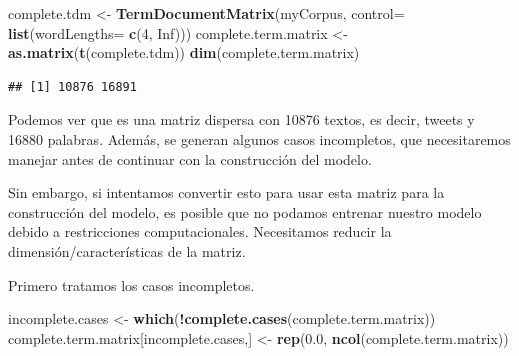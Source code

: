 \documentclass[
]{article}
\newenvironment{Shaded}{\begin{snugshade}}{\end{snugshade}}
\newcommand{\DataTypeTok}[1]{\textcolor[rgb]{0.13,0.29,0.53}{#1}}
\newcommand{\DecValTok}[1]{\textcolor[rgb]{0.00,0.00,0.81}{#1}}
\newcommand{\FloatTok}[1]{\textcolor[rgb]{0.00,0.00,0.81}{#1}}
\newcommand{\KeywordTok}[1]{\textcolor[rgb]{0.13,0.29,0.53}{\textbf{#1}}}
\newcommand{\NormalTok}[1]{#1}
\newcommand{\OperatorTok}[1]{\textcolor[rgb]{0.81,0.36,0.00}{\textbf{#1}}}
\newcommand{\OtherTok}[1]{\textcolor[rgb]{0.56,0.35,0.01}{#1}}
\newcommand{\StringTok}[1]{\textcolor[rgb]{0.31,0.60,0.02}{#1}}
\begin{document}
\begin{Shaded}
\begin{Highlighting}[]
\NormalTok{complete.tdm <-}\StringTok{ }\KeywordTok{TermDocumentMatrix}\NormalTok{(myCorpus, }\DataTypeTok{control=} \KeywordTok{list}\NormalTok{(}\DataTypeTok{wordLengths=} \KeywordTok{c}\NormalTok{(}\DecValTok{4}\NormalTok{, }\OtherTok{Inf}\NormalTok{)))}
\NormalTok{complete.term.matrix <-}\StringTok{ }\KeywordTok{as.matrix}\NormalTok{(}\KeywordTok{t}\NormalTok{(complete.tdm))}
\KeywordTok{dim}\NormalTok{(complete.term.matrix)}
\end{Highlighting}
\end{Shaded}

\begin{verbatim}
## [1] 10876 16891
\end{verbatim}

Podemos ver que es una matriz dispersa con 10876 textos, es decir,
tweets y 16880 palabras. Además, se generan algunos casos incompletos,
que necesitaremos manejar antes de continuar con la construcción del
modelo.

Sin embargo, si intentamos convertir esto para usar esta matriz para la
construcción del modelo, es posible que no podamos entrenar nuestro
modelo debido a restricciones computacionales. Necesitamos reducir la
dimensión/características de la matriz.

Primero tratamos los casos incompletos.

\begin{Shaded}
\begin{Highlighting}[]
\NormalTok{incomplete.cases <-}\StringTok{ }\KeywordTok{which}\NormalTok{(}\OperatorTok{!}\KeywordTok{complete.cases}\NormalTok{(complete.term.matrix))}
\NormalTok{complete.term.matrix[incomplete.cases,] <-}\StringTok{ }\KeywordTok{rep}\NormalTok{(}\FloatTok{0.0}\NormalTok{, }\KeywordTok{ncol}\NormalTok{(complete.term.matrix))}
\end{Highlighting}
\end{Shaded}

\begin{Shaded}
\end{Shaded}
\end{document}
